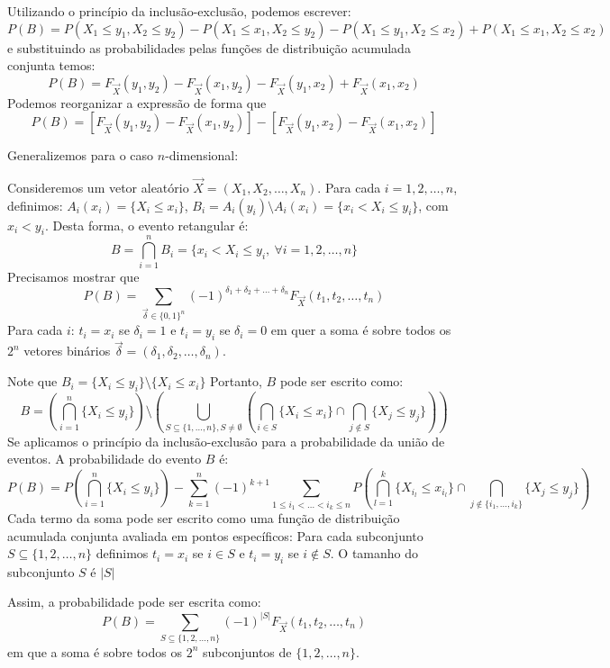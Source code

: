\begin{frame}
Utilizando o princípio da inclusão-exclusão, podemos escrever:
\[
P(B) = P(X_1 \leq y_1, X_2 \leq y_2) - P(X_1 \leq x_1, X_2 \leq y_2) - P(X_1 \leq y_1, X_2 \leq x_2) + P(X_1 \leq x_1, X_2 \leq x_2)
\]	e substituindo as probabilidades pelas funções de distribuição acumulada conjunta temos:
\[
P(B) = F_{\vec{X}}(y_1, y_2) - F_{\vec{X}}(x_1, y_2) - F_{\vec{X}}(y_1, x_2) + F_{\vec{X}}(x_1, x_2)
\]
Podemos reorganizar a expressão de forma que 
\[
P(B) = [F_{\vec{X}}(y_1, y_2) - F_{\vec{X}}(x_1, y_2)] - [F_{\vec{X}}(y_1, x_2) - F_{\vec{X}}(x_1, x_2)]
\]

\medskip 
Generalizemos para o caso \( n \)-dimensional:

\medskip   Consideremos um vetor aleatório \( \vec{X} = (X_1, X_2, \ldots, X_n) \). Para cada \( i = 1, 2, \ldots, n \), definimos: \( A_i(x_i) = \{ X_i \leq x_i \} \),  \( B_i = A_i(y_i) \setminus A_i(x_i) = \{ x_i < X_i \leq y_i \} \), com \( x_i < y_i \). Desta forma,  o evento retangular é:
\[
B = \bigcap_{i=1}^{n} B_i = \{ x_i < X_i \leq y_i, \ \forall i = 1, 2, \ldots, n \}
\]
Precisamos mostrar que 
\[
P(B) = \sum_{\vec{\delta} \in \{0,1\}^n} (-1)^{\delta_1 + \delta_2 + \ldots + \delta_n} F_{\vec{X}}(t_1, t_2, \ldots, t_n)
\]
Para cada \( i \): \( t_i = x_i \) se \( \delta_i = 1 \) e \( t_i = y_i \) se \( \delta_i = 0 \) em quer a soma é sobre todos os \( 2^n \) vetores binários \( \vec{\delta} = (\delta_1, \delta_2, \ldots, \delta_n) \).


\end{frame}		

\begin{frame}
Note que
\( B_i = \{ X_i \leq y_i \} \setminus \{ X_i \leq x_i \} \) Portanto, \( B \) pode ser escrito como:
\[
B = \left( \bigcap_{i=1}^{n} \{ X_i \leq y_i \} \right) \setminus \left( \bigcup_{S \subseteq \{1, \ldots, n\}, S \neq \emptyset} \left( \bigcap_{i \in S} \{ X_i \leq x_i \} \cap \bigcap_{j \notin S} \{ X_j \leq y_j \} \right) \right)
\]
Se aplicamos o princípio da inclusão-exclusão para a probabilidade da união de eventos. A probabilidade do evento \( B \) é:
\[
P(B) = P\left( \bigcap_{i=1}^{n} \{ X_i \leq y_i \} \right) - \sum_{k=1}^{n} (-1)^{k+1} \sum_{1 \leq i_1 < \ldots < i_k \leq n} P\left( \bigcap_{l=1}^{k} \{ X_{i_l} \leq x_{i_l} \} \cap \bigcap_{j \notin \{ i_1, \ldots, i_k \}} \{ X_j \leq y_j \} \right)
\]
Cada termo da soma pode ser escrito como uma função de distribuição acumulada conjunta avaliada em pontos específicos: Para cada subconjunto \( S \subseteq \{1, 2, \ldots, n\} \) definimos \( t_i = x_i \) se \( i \in S \) e \( t_i = y_i \) se \( i \notin S \). O tamanho do subconjunto \( S \) é \( |S| \)

Assim, a probabilidade pode ser escrita como:
\[
P(B) = \sum_{S \subseteq \{1, 2, \ldots, n\}} (-1)^{|S|} F_{\vec{X}}(t_1, t_2, \ldots, t_n)
\] em que a soma é sobre todos os \( 2^n \) subconjuntos de \( \{1, 2, \ldots, n\} \).

\end{frame}

